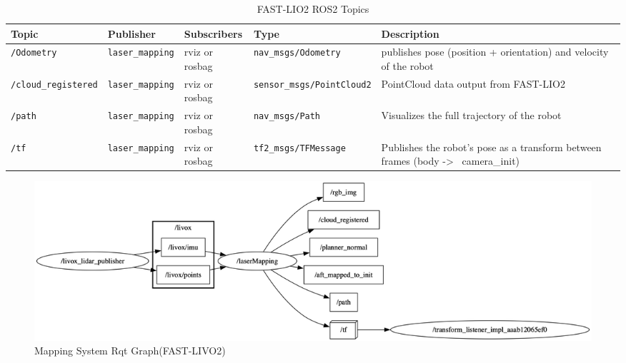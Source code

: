 \documentclass[english, bachelor, utf8]{base/thesis_telematics}
\begin{document}
\begin{table}[H]
\centering
\caption{FAST-LIO2 ROS2 Topics}
\label{tab:fast_lio_topics}
\scriptsize  %
\begin{tabularx}{\textwidth}{@{}llXlX@{}}
\toprule
\textbf{Topic} & \textbf{Publisher} & \textbf{Subscribers} & \textbf{Type} & \textbf{Description} \\
\midrule
\texttt{/Odometry} & \texttt{laser\_mapping} & rviz or rosbag & \texttt{nav\_msgs/Odometry} & publishes pose (position + orientation) and velocity of the robot \\[0.3em]
\texttt{/cloud\_registered} & \texttt{laser\_mapping} & rviz or rosbag & \texttt{sensor\_msgs/PointCloud2} & PointCloud data output from FAST-LIO2 \\
\texttt{/path} & \texttt{laser\_mapping} & rviz or rosbag & \texttt{nav\_msgs/Path} & Visualizes the full trajectory of the robot \\
\texttt{/tf} & \texttt{laser\_mapping} & rviz or rosbag & \texttt{tf2\_msgs/TFMessage} & Publishes the robot’s pose as a transform between frames (body -\textgreater~ camera\_init) \\

\bottomrule
\end{tabularx}
\end{table}
\begin{figure}[H]
    \centering
    \includegraphics[width=\textwidth]{pics/rqt/ros_fast_livo.png}
    \caption{Mapping System Rqt Graph(FAST-LIVO2)}
    \label{fig:ros_fast_livo}
\end{figure}
\end{document}
